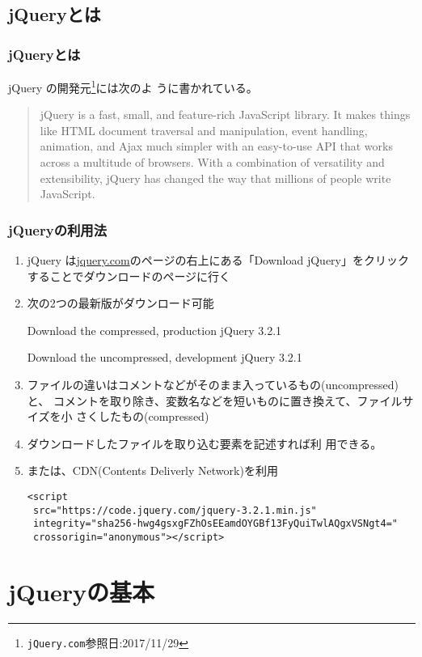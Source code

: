 \subsection{jQueryとは}
\begin{frame}[containsverbatim]
\frametitle{jQueryとは}
jQuery の開発元\footnote{\texttt{jQuery.com}参照日:2017/11/29}には次のよ
 うに書かれている。
\begin{quotation}
jQuery is a fast, small, and feature-rich JavaScript library. It makes
 things like HTML document traversal and manipulation, event handling,
 animation, and Ajax much simpler with an easy-to-use API that works
 across a multitude of browsers. With a combination of versatility and
 extensibility, jQuery has changed the way that millions of people write
 JavaScript.
\end{quotation}
\end{frame}
\begin{frame}[containsverbatim]
\frametitle{jQueryの利用法}
\begin{enumerate}
 \item jQuery は\href{jquery.com}{jquery.com}のページの右上にある「Download
jQuery」をクリックすることでダウンロードのページに行く
 \item 次の2つの最新版がダウンロード可能

     Download the compressed, production jQuery 3.2.1

    Download the uncompressed, development jQuery 3.2.1
 \item ファイルの違いはコメントなどがそのまま入っているもの(uncompressed)と、
コメントを取り除き、変数名などを短いものに置き換えて、ファイルサイズを小
さくしたもの(compressed)
 \item ダウンロードしたファイルを取り込む要素を記述すれば利
       用できる。
 \item または、CDN(Contents Deliverly Network)を利用
\begin{Verbatim}[fontsize=\small]
<script
 src="https://code.jquery.com/jquery-3.2.1.min.js"
 integrity="sha256-hwg4gsxgFZhOsEEamdOYGBf13FyQuiTwlAQgxVSNgt4="
 crossorigin="anonymous"></script>
\end{Verbatim}
\end{enumerate}

\end{frame}
\newcommand{\FuncRef}[1]{%
\refstepcounter{Func}\label{#1}({\bfseries 機能\arabic{Func}})}
\section{jQueryの基本}

